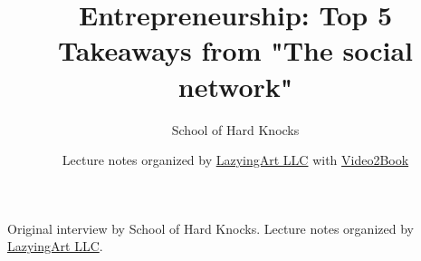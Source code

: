 \documentclass[11pt,oneside]{book}
\begin{document}
\frontmatter
\title{Entrepreneurship: Top 5 Takeaways from "The social network"}
\author{School of Hard Knocks}
\date{Lecture notes organized by \href{https://lazying.art}{LazyingArt LLC} with \href{https://github.com/lachlanchen/Video2Book}{Video2Book}}
\maketitle
\begin{center}
\small Original interview by School of Hard Knocks. Lecture notes organized by \href{https://lazying.art}{LazyingArt LLC}.
\end{center}
\clearpage
\mainmatter

\end{document}
